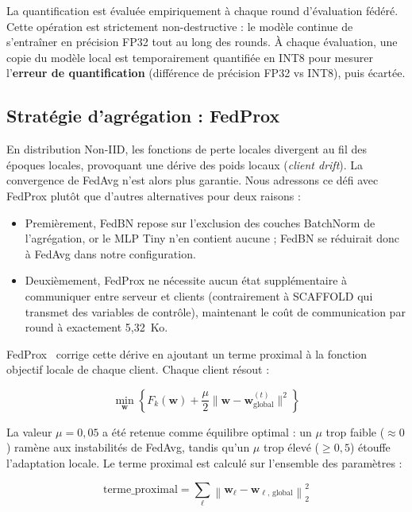 \documentclass{article}
\begin{document}
La quantification est évaluée empiriquement à chaque round d'évaluation fédéré. Cette
opération est strictement non-destructive : le modèle continue de s'entraîner en
précision FP32 tout au long des rounds. À chaque évaluation, une copie du modèle local
est temporairement quantifiée en INT8 pour mesurer l'\textbf{erreur de quantification}
(différence de précision FP32 vs INT8), puis écartée.

\subsection{Stratégie d'agrégation : FedProx}
\label{subsec:fedprox}

En distribution Non-IID, les fonctions de perte locales divergent au fil des époques
locales, provoquant une dérive des poids locaux (\textit{client drift}). La convergence
de FedAvg n'est alors plus garantie. Nous adressons ce défi avec FedProx plutôt que
d'autres alternatives pour deux raisons :

\begin{itemize}
  \item Premièrement, FedBN repose sur l'exclusion des couches BatchNorm de
  l'agrégation, or le MLP Tiny n'en contient aucune ; FedBN se réduirait donc à FedAvg
  dans notre configuration.
  \item Deuxièmement, FedProx ne nécessite aucun état supplémentaire à communiquer
  entre serveur et clients (contrairement à SCAFFOLD qui transmet des variables de
  contrôle), maintenant le coût de communication par round à exactement 5,32~Ko.
\end{itemize}

FedProx~\cite{li2020fedprox} corrige cette dérive en ajoutant un terme proximal à la
fonction objectif locale de chaque client. Chaque client résout :

\begin{equation}
  \min_{\mathbf{w}} \left\{ F_k(\mathbf{w}) + \frac{\mu}{2}
  \| \mathbf{w} - \mathbf{w}^{(t)}_{\text{global}} \|^2 \right\}
  \label{eq:fedprox_form}
\end{equation}

La valeur $\mu = 0{,}05$ a été retenue comme équilibre optimal : un $\mu$ trop faible
($\approx 0$) ramène aux instabilités de FedAvg, tandis qu'un $\mu$ trop élevé
($\geq 0{,}5$) étouffe l'adaptation locale. Le terme proximal est calculé sur
l'ensemble des paramètres :

\begin{equation}
  \text{terme\_proximal} = \sum_{\ell} \left\|
  \mathbf{w}_\ell - \mathbf{w}_{\ell,\,\text{global}} \right\|^2_2
  \label{eq:proxterm}
\end{equation}
\end{document}
